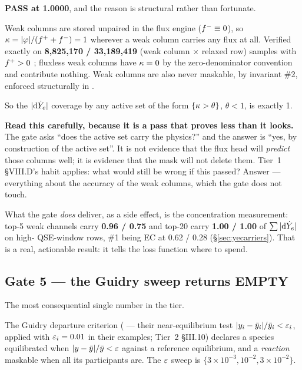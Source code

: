 \textbf{PASS at 1.0000}, and the reason is structural rather than fortunate.

Weak columns are stored unpaired in the flux engine ($f^{-} \equiv 0$), so
$\kappa = |\varphi|/(f^{+} + f^{-}) = 1$ wherever a weak column carries any flux at
all. Verified exactly on \textbf{8,825,170 / 33,189,419} (weak column $\times$
relaxed row) samples with $f^{+} > 0$ ; fluxless weak
columns have $\kappa = 0$ by the zero-denominator convention and contribute
nothing. Weak columns are also never maskable, by invariant \#2, enforced
structurally in .

So the $|\mathrm{d}\dot Y_{e}|$ coverage by any active set of the form $\{\kappa > \theta\}$,
$\theta < 1$, is exactly 1.

\textbf{Read this carefully, because it is a pass that proves less than it
looks.} The gate asks ``does the active set carry the \Ye{} physics?'' and the
answer is ``yes, by construction of the active set''. It is not evidence that
the flux head will \emph{predict} those columns well; it is evidence that the
mask will not delete them. Tier~1 \S VIII.D's habit applies: what would still be
wrong if this passed? Answer --- everything about the accuracy of the weak
columns, which the gate does not touch.

What the gate \emph{does} deliver, as a side effect, is the concentration
measurement: top-5 weak channels carry \textbf{0.96 / 0.75} and top-20 carry
\textbf{1.00 / 1.00} of $\sum|\mathrm{d}\dot Y_{e}|$ on high-\Ye{} QSE-window rows, \#1
being  EC at 0.62 / 0.28 (\S\ref{sec:yecarriers}). That is a real,
actionable result: it tells the loss function where to spend.

\subsection{Gate 5 --- the Guidry sweep returns EMPTY}
\label{sec:gate5}

The most consequential single number in the tier.

The Guidry departure criterion (\citealt{guidry2013a} --- their
near-equilibrium test $|y_i - \bar y_i|/\bar y_i < \varepsilon_i$, applied with
$\varepsilon_i = 0.01$ in their examples; Tier~2 \S III.10) declares a species
equilibrated when $|y - \bar y|/\bar y < \varepsilon$ against a reference equilibrium,
and a \emph{reaction} maskable when all its participants are. The $\varepsilon$ sweep
is $\{3\times10^{-3}, 10^{-2}, 3\times10^{-2}\}$.

